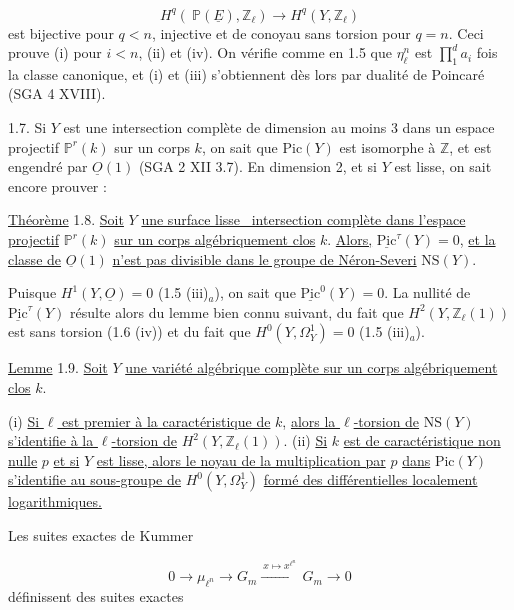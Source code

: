 \begin{equation*}
H^q(\ \mathbb{P}(\underline{E}), \mathbb{Z}_\ell) \longrightarrow H^q(Y, \mathbb{Z}_\ell)
\end{equation*}
est bijective pour $q < n$, injective et de conoyau sans torsion pour $q = n$. Ceci prouve (i) pour $i < n$, (ii) et (iv). On vérifie comme en 1.5 que $\eta_\ell^n$ est $\prod_1^d a_i$ fois la classe canonique, et (i) et (iii) s'obtiennent dès lors par dualité de Poincaré (SGA 4 XVIII).

1.7. Si $Y$ est une intersection complète de dimension au moins 3 dans un espace projectif $\mathbb{P}^r(k)$ sur un corps $k$, on sait que $\mathrm{Pic}(Y)$ est isomorphe à $\mathbb{Z}$, et est engendré par $\underline{O}(1)$ (SGA 2 XII 3.7). En dimension 2, et si $Y$ est lisse, on sait encore prouver :

\underline{Théorème} 1.8. \underline{Soit} $Y$ \underline{une surface lisse \ intersection complète dans l'espace projectif} $\mathbb{P}^r(k)$ \underline{sur un corps algébriquement clos} $k$. \underline{Alors,} $\underline{\mathrm{Pic}}^\tau(Y) = 0$, \underline{et la classe de} $\underline{O}(1)$ \underline{n'est pas divisible dans le groupe de Néron-Severi} $\mathrm{NS}(Y)$.

Puisque $H^1(Y,\underline{O}) = 0$ (1.5 (iii)$_a$), on sait que $\underline{\mathrm{Pic}}^0(Y) = 0$. La nullité de $\underline{\mathrm{Pic}}^\tau(Y)$ résulte alors du lemme bien connu suivant, du fait que $H^2(Y, \mathbb{Z}_\ell(1))$ est sans torsion (1.6 (iv)) et du fait que $H^0(Y,\Omega^1_Y) = 0$ (1.5 (iii)$_a$).

\underline{Lemme} 1.9. \underline{Soit} $Y$ \underline{une variété algébrique complète sur un corps algébriquement clos} $k$.

(i) \underline{Si $\ell$ est premier à la caractéristique de} $k$, \underline{alors la $\ell$-torsion de} $\mathrm{NS}(Y)$ \underline{s'identifie à la $\ell$-torsion de} $H^2(Y, \mathbb{Z}_\ell(1))$.
(ii) \underline{Si} $k$ \underline{est de caractéristique non nulle} $p$ \underline{et si} $Y$ \underline{est lisse, alors le noyau de la multiplication par} $p$ \underline{dans} $\mathrm{Pic}(Y)$ \underline{s'identifie au sous-groupe de} $H^0(Y,\Omega^1_Y)$ \underline{formé des différentielles localement logarithmiques.}

Les suites exactes de Kummer

\begin{equation*}
0 \longrightarrow \mu_{\ell^n} \longrightarrow G_m \xrightarrow{\ x \mapsto x^{\ell^n}\ } G_m \longrightarrow 0
\end{equation*}
définissent des suites exactes

